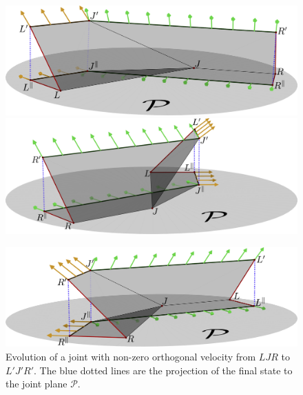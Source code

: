 \begin{figure}
\vspace*{-1.5em}
\graphicspath{{figures/trapezoidZ}}
    \centering
        \includegraphics[width=0.48\linewidth]{figures/trapezoidZ/trapezoidZ0.pdf}%
    \hfill
        \includegraphics[width=0.48\linewidth]{figures/trapezoidZ/trapezoidZ1.pdf}%

        \includegraphics[width=\linewidth]{figures/trapezoidZ/trapezoidZ2.pdf}%
    \caption{
    Evolution of a joint with non-zero orthogonal velocity from $LJR$ to $L'J'R'$.
    The blue dotted lines are the projection of the final state to the joint plane $\mathcal P$.
    }
    \label{fig:trapezoidZ}
\end{figure}
